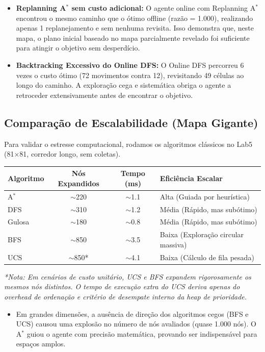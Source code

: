 \documentclass[12pt,a4paper]{article}
\begin{document}
\begin{itemize}
    \item \textbf{Replanning A$^*$ sem custo adicional:} O agente online com Replanning A$^*$ encontrou o mesmo caminho que o ótimo offline (razão = 1.000), realizando apenas 1 replanejamento e sem nenhuma revisita. Isso demonstra que, neste mapa, o plano inicial baseado no mapa parcialmente revelado foi suficiente para atingir o objetivo sem desperdício.
    \item \textbf{Backtracking Excessivo do Online DFS:} O Online DFS percorreu 6 vezes o custo ótimo (72 movimentos contra 12), revisitando 49 células ao longo do caminho. A exploração cega e sistemática obriga o agente a retroceder extensivamente antes de encontrar o objetivo.
\end{itemize}

\subsection{Comparação de Escalabilidade (Mapa Gigante)}
Para validar o estresse computacional, rodamos os algoritmos clássicos no Lab5 (81×81, corredor longo, sem coletas).

\begin{table}[H]
\centering
\begin{tabular}{lccl}
\toprule
\textbf{Algoritmo} & \textbf{Nós Expandidos} & \textbf{Tempo (ms)} & \textbf{Eficiência Escalar} \\
\midrule
A$^*$  & $\sim$220  & $\sim$1.1 & Alta (Guiada por heurística) \\
DFS    & $\sim$310  & $\sim$1.2 & Média (Rápido, mas subótimo) \\
Gulosa & $\sim$180  & $\sim$0.8 & Média (Rápido, mas subótimo) \\
BFS    & $\sim$850  & $\sim$3.5 & Baixa (Exploração circular massiva) \\
UCS    & $\sim$850* & $\sim$4.1 & Baixa (Cálculo de fila pesada) \\
\bottomrule
\end{tabular}

\vspace{0.2cm}
\footnotesize{\textit{*Nota: Em cenários de custo unitário, UCS e BFS expandem rigorosamente os mesmos nós distintos. O tempo de execução extra do UCS deriva apenas do \textit{overhead} de ordenação e critério de desempate interno da \textit{heap} de prioridade.}}
\end{table}

\begin{itemize}
    \item Em grandes dimensões, a ausência de direção dos algoritmos cegos (BFS e UCS) causou uma explosão no número de nós avaliados (quase 1.000 nós). O A$^*$ guiou o agente com precisão matemática, provando ser indispensável para espaços amplos.
\end{itemize}
\end{document}
